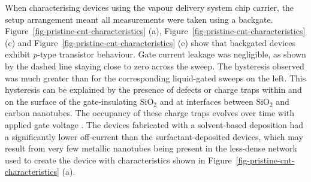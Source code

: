 \documentclass[
  a4paper,
]{scrbook}
\begin{document}
When characterising devices using the vapour delivery system chip
carrier, the setup arrangement meant all measurements were taken using a
backgate. Figure~\ref{fig-pristine-cnt-characteristics} (a),
Figure~\ref{fig-pristine-cnt-characteristics} (c) and
Figure~\ref{fig-pristine-cnt-characteristics} (e) show that backgated
devices exhibit \emph{p}-type transistor behaviour. Gate current leakage
was negligible, as shown by the dashed line staying close to zero across
the sweep. The hysteresis observed was much greater than for the
corresponding liquid-gated sweeps on the left. This hysteresis can be
explained by the presence of defects or charge traps within and on the
surface of the gate-insulating SiO\(_2\) and at interfaces between
SiO\(_2\) and carbon nanotubes. The occupancy of these charge traps
evolves over time with applied gate voltage
\autocite{Lee2007,Lee2012,Ha2014}. The devices fabricated with a
solvent-based deposition had a significantly lower off-current than the
surfactant-deposited devices, which may result from very few metallic
nanotubes being present in the less-dense network \autocite{Rouhi2011}
used to create the device with characteristics shown in
Figure~\ref{fig-pristine-cnt-characteristics} (a).
\end{document}
